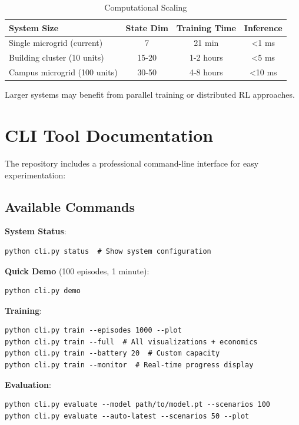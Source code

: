 \documentclass[11pt,a4paper]{article}
\begin{document}
\begin{table}[h]
\centering
\caption{Computational Scaling}
\begin{tabular}{lccc}
\toprule
\textbf{System Size} & \textbf{State Dim} & \textbf{Training Time} & \textbf{Inference} \\
\midrule
Single microgrid (current) & 7 & 21 min & <1 ms \\
Building cluster (10 units) & 15-20 & 1-2 hours & <5 ms \\
Campus microgrid (100 units) & 30-50 & 4-8 hours & <10 ms \\
\end{tabular}
\end{table}

Larger systems may benefit from parallel training or distributed RL approaches.

\section{CLI Tool Documentation}
\label{app:cli}

The repository includes a professional command-line interface for easy experimentation:

\subsection{Available Commands}

\textbf{System Status}:
\begin{verbatim}
python cli.py status  # Show system configuration
\end{verbatim}

\textbf{Quick Demo} (100 episodes, 1 minute):
\begin{verbatim}
python cli.py demo
\end{verbatim}

\textbf{Training}:
\begin{verbatim}
python cli.py train --episodes 1000 --plot
python cli.py train --full  # All visualizations + economics
python cli.py train --battery 20  # Custom capacity
python cli.py train --monitor  # Real-time progress display
\end{verbatim}

\textbf{Evaluation}:
\begin{verbatim}
python cli.py evaluate --model path/to/model.pt --scenarios 100
python cli.py evaluate --auto-latest --scenarios 50 --plot
\end{verbatim}
\end{document}
